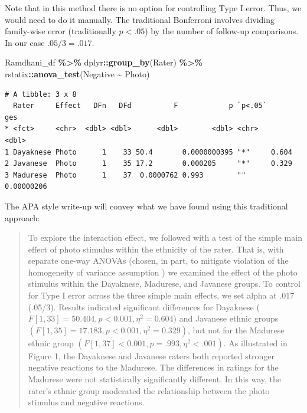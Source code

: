\documentclass[
  11pt,
]{book}
\newenvironment{Shaded}{\begin{snugshade}}{\end{snugshade}}
\newcommand{\FunctionTok}[1]{\textcolor[rgb]{0.27,0.27,0.27}{\textbf{#1}}}
\newcommand{\NormalTok}[1]{#1}
\newcommand{\SpecialCharTok}[1]{\textcolor[rgb]{0.43,0.43,0.43}{\textbf{#1}}}
\begin{document}
Note that in this method there is no option for controlling Type I error. Thus, we would need to do it manually. The traditional Bonferroni involves dividing family-wise error (traditionally \(p < .05\)) by the number of follow-up comparisons. In our case \(.05/3 = .017\).

\begin{Shaded}
\begin{Highlighting}[]
\NormalTok{Ramdhani\_df }\SpecialCharTok{\%\textgreater{}\%}
\NormalTok{    dplyr}\SpecialCharTok{::}\FunctionTok{group\_by}\NormalTok{(Rater) }\SpecialCharTok{\%\textgreater{}\%}
\NormalTok{    rstatix}\SpecialCharTok{::}\FunctionTok{anova\_test}\NormalTok{(Negative }\SpecialCharTok{\textasciitilde{}}\NormalTok{ Photo)}
\end{Highlighting}
\end{Shaded}

\begin{verbatim}
# A tibble: 3 x 8
  Rater     Effect   DFn   DFd          F            p `p<.05`        ges
* <fct>     <chr>  <dbl> <dbl>      <dbl>        <dbl> <chr>        <dbl>
1 Dayaknese Photo      1    33 50.4       0.0000000395 "*"     0.604     
2 Javanese  Photo      1    35 17.2       0.000205     "*"     0.329     
3 Madurese  Photo      1    37  0.0000762 0.993        ""      0.00000206
\end{verbatim}

The APA style write-up will convey what we have found using this traditional approach:

\begin{quote}
To explore the interaction effect, we followed with a test of the simple main effect of photo stimulus within the ethnicity of the rater. That is, with separate one-way ANOVAs (chosen, in part, to mitigate violation of the homogeneity of variance assumption \citep{kassambara_anova_nodate}) we examined the effect of the photo stimulus within the Dayaknese, Madurese, and Javanese groups. To control for Type I error across the three simple main effects, we set alpha at .017 (.05/3). Results indicated significant differences for Dayaknese (\(F [1, 33] = 50.404, p < 0.001, \eta ^{2} = 0.604\)) and Javanese ethnic groups \((F [1, 35] = 17.183, p < 0.001, \eta ^{2} = 0.329)\), but not for the Madurese ethnic group \((F [1, 37] < 0.001, p = .993, \eta ^{2} < .001)\). As illustrated in Figure 1, the Dayaknese and Javanese raters both reported stronger negative reactions to the Madurese. The differences in ratings for the Madurese were not statistically significantly different. In this way, the rater's ethnic group moderated the relationship between the photo stimulus and negative reactions.
\end{quote}
\end{document}
